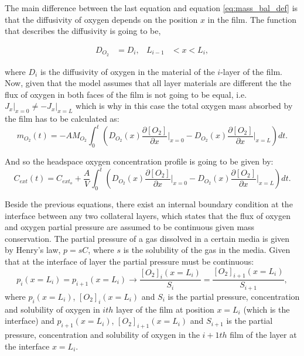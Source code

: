\begin{refsection}
The main difference between the last equation and  equation \ref{eq:mass_bal_def} is that the diffusivity of oxygen depends on the position $x$ in the film. The function that describes the diffusivity is going to be, 

\begin{align}
    D_{O_2}&=  D_i,  & L_{i-1}&< x< L_i,
\end{align}

where $D_i$ is the diffusivity of oxygen in the material of the $i$-layer of the film. Now, given that the model assumes that all layer materials are different the the flux of oxygen in both faces of the film is not going to be equal, i.e. $J_x\rvert_{x = 0}\neq-J_x\rvert_{x = L} $  which is why in this case the total oxygen mass absorbed  by the film has to be calculated as:
\begin{equation}
    m_{O_2}(t) =-AM_{O_2}\int_0^t \left(D_{O_2}(x)\frac{\partial [O_2]}{\partial x}\biggr\rvert_{x = 0} -D_{O_2}(x)\frac{\partial [O_2]}{\partial x}\biggr\rvert_{x = L}\right )dt.
    \label{eq:total_mass_O2_multi}
\end{equation}

And so the headspace oxygen concentration profile is going to be given by:
\begin{equation}
    C_{ext}(t)=C_{ext_o} + \frac{A}{V} \int_0^t \left(D_{O_2}(x)\frac{\partial [O_2]}{\partial x}\biggr\rvert_{x = 0} -D_{O_2}(x)\frac{\partial [O_2]}{\partial x}\biggr\rvert_{x = L}\right) dt.
    \label{eq:headspace_multi}
\end{equation}

Beside the previous equations, there exist an internal boundary condition at the interface between any two collateral layers, which states that the flux of oxygen and oxygen partial pressure are assumed to be continuous given mass conservation. The partial pressure of a gas dissolved in a certain media is given by Henry's law, $p=sC$, where $s$  is the solubility of the gas in the media. Given that at the interface of layer the partial pressure must be continuous:
 \begin{equation}
   p_{i}(x=L_i) =p_{i+1}(x=L_i)  \xrightarrow{}\frac{[O_2]_{i}(x=L_i)}{S_{i}} =\frac{[O_2]_{i+1}(x=L_i)}{S_{i+1}},
 \end{equation} where $p_{i}(x=L_i)$, $[O_2]_{i}(x=L_i)$ and $S_{i}$ is the partial pressure, concentration and solubility of oxygen in $ith$ layer of the film at position $x=L_i$ (which is the interface) and  $p_{i+1}(x=L_i)$, $[O_2]_{i+1}(x=L_i)$ and $S_{i+1}$ is the partial pressure, concentration and solubility of oxygen in the $i+1th$ film of the layer at the interface $x=L_i$. 


\end{refsection}
